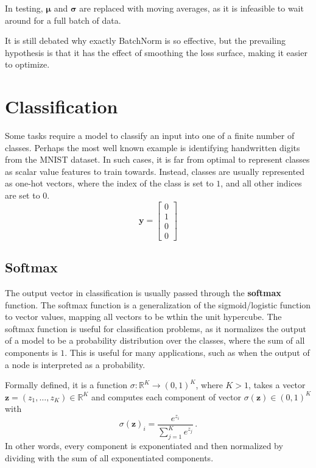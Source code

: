 \documentclass[12pt]{report}
\theoremstyle{definition}
\theoremstyle{remark}
\begin{document}
In testing, $\boldsymbol{\mu}$ and $\boldsymbol{\sigma}$ are replaced with moving averages, as it is infeasible to wait around for a full batch of data.

It is still debated why exactly BatchNorm is so effective, but the prevailing hypothesis is that it has the effect of smoothing the loss surface, making it easier to optimize.

\section{Classification}\label{sec:classification}
Some tasks require a model to classify an input into one of a finite number of classes. Perhaps the most well known example is identifying handwritten digits from the MNIST dataset. In such cases, it is far from optimal to represent classes as scalar value features to train towards. Instead, classes are usually represented as one-hot vectors, where the index of the class is set to $1$, and all other indices are set to $0$.
\begin{equation}
    \mathbf{y} = \begin{bmatrix}
        0 \\
        1 \\
        0 \\
        0
    \end{bmatrix}
\end{equation}
\subsection{Softmax}
The output vector in classification is usually passed through the \textbf{softmax} function. The softmax function is a generalization of the sigmoid/logistic function to vector values, mapping all vectors to be wthin the unit hypercube. The softmax function is useful for classification problems, as it normalizes the output of a model to be a probability distribution over the classes, where the sum of all components is $1$. This is useful for many applications, such as when the output of a node is interpreted as a probability.

Formally defined, it is a function $\sigma\colon \mathbb{R}^K \to (0, 1)^K$, where $K > 1$, takes a vector $\mathbf{z} = (z_1, \dotsc, z_K) \in \mathbb{R}^K$ and computes each component of vector $\sigma(\mathbf{z}) \in (0, 1)^K$ with
\begin{equation}
\sigma(\mathbf{z})_i = \frac{e^{z_i}}{\sum_{j=1}^K e^{z_j}}\,.
\end{equation}
In other words, every component is exponentiated and then normalized by dividing with the sum of all exponentiated components.
\end{document}
